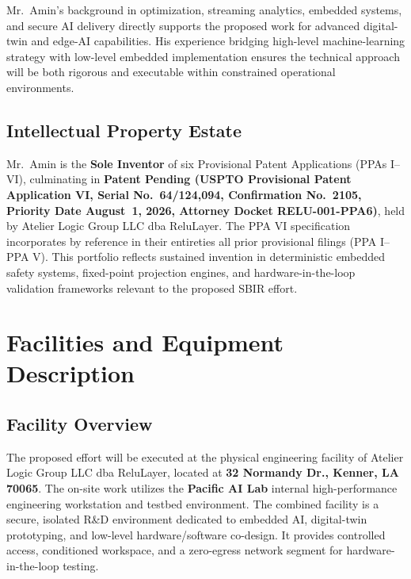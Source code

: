 \documentclass[11pt]{article}
\begin{document}
Mr.~Amin's background in optimization, streaming analytics, embedded systems, and secure AI delivery directly supports the proposed work for advanced digital-twin and edge-AI capabilities. His experience bridging high-level machine-learning strategy with low-level embedded implementation ensures the technical approach will be both rigorous and executable within constrained operational environments.

\subsection{Intellectual Property Estate}

Mr.~Amin is the \textbf{Sole Inventor} of six Provisional Patent Applications (PPAs I--VI), culminating in \textbf{Patent Pending (USPTO Provisional Patent Application VI, Serial No.~64/124,094, Confirmation No.~2105, Priority Date August~1, 2026, Attorney Docket RELU-001-PPA6)}, held by Atelier Logic Group LLC dba ReluLayer\texttrademark. The PPA VI specification incorporates by reference in their entireties all prior provisional filings (PPA I--PPA V). This portfolio reflects sustained invention in deterministic embedded safety systems, fixed-point projection engines, and hardware-in-the-loop validation frameworks relevant to the proposed SBIR effort.

\newpage

\section{Facilities and Equipment Description}

\subsection{Facility Overview}

The proposed effort will be executed at the physical engineering facility of Atelier Logic Group LLC dba ReluLayer\texttrademark, located at \textbf{32 Normandy Dr., Kenner, LA 70065}. The on-site work utilizes the \textbf{Pacific AI Lab} internal high-performance engineering workstation and testbed environment. The combined facility is a secure, isolated R\&D environment dedicated to embedded AI, digital-twin prototyping, and low-level hardware/software co-design. It provides controlled access, conditioned workspace, and a zero-egress network segment for hardware-in-the-loop testing.
\end{document}
